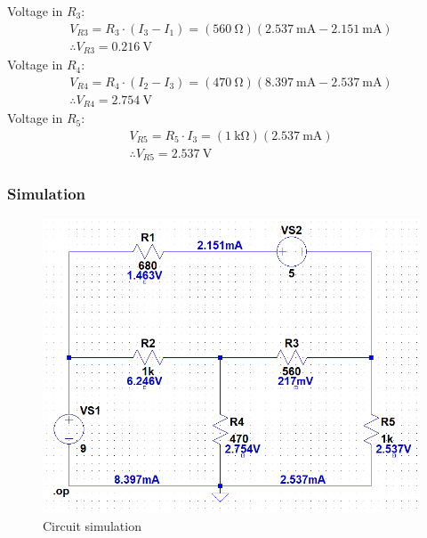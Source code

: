 \documentclass[letterpaper]{article}
\begin{document}
Voltage in $R_3$:
\begin{gather*}V_{R3} = R_3\cdot(I_3-I_1)
    =(\SI{560}{\ohm})(\SI{2.537}{\milli\ampere}-\SI{2.151}{\milli\ampere})\\\therefore V_{R3} =
\SI{0.216}{\volt}
\end{gather*}
Voltage in $R_4$:
\begin{gather*}V_{R4} = R_4\cdot(I_2-I_3)
    =(\SI{470}{\ohm})(\SI{8.397}{\milli\ampere}-\SI{2.537}{\milli\ampere})\\\therefore V_{R4} =
\SI{2.754}{\volt}
\end{gather*}
Voltage in $R_5$:
\begin{gather*}V_{R5} = R_5\cdot I_3
    =(\SI{1}{\kilo\ohm})(\SI{2.537}{\milli\ampere})\\\therefore V_{R5} =
\SI{2.537}{\volt}
\end{gather*}
\subsubsection{Simulation}
\begin{figure}[H]
    \centering
    \includegraphics[width=.8\linewidth]{sim1}
    \caption{Circuit simulation}
\end{figure}
\end{document}
